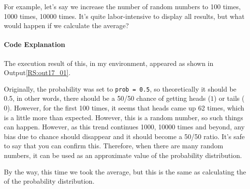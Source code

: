 \documentclass{ltjsbook}
\begin{document}
For example, let's say we increase the number of random numbers to 100 times, 1000 times, 10000 times. It's quite labor-intensive to display all results, but what would happen if we calculate the average?

\paragraph{Code Explanation}

The execution result of this, in my environment, appeared as shown in Output\ref{RS:out17_01}.



Originally, the probability was set to \texttt{prob = 0.5}, so theoretically it should be 0.5, in other words, there should be a 50/50 chance of getting heads ($1$) or tails ($0$). However, for the first 100 times, it seems that heads came up 62 times, which is a little more than expected. However, this is a random number, so such things can happen. However, as this trend continues 1000, 10000 times and beyond, any bias due to chance should disappear and it should become a 50/50 ratio. It's safe to say that you can confirm this. Therefore, when there are many random numbers, it can be used as an approximate value of the probability distribution.

By the way, this time we took the average, but this is the same as calculating the  of the probability distribution.
\end{document}
